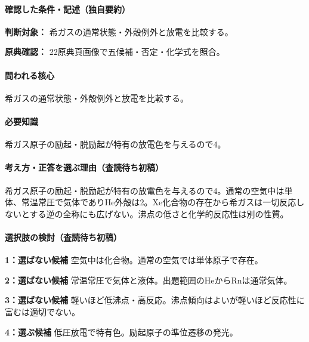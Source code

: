 \paragraph{確認した条件・記述（独自要約）}\mbox{}\par

\noindent\textbf{判断対象：} 希ガスの通常状態・外殻例外と放電を比較する。\par

\noindent\textbf{原典確認：} 22原典頁画像で五候補・否定・化学式を照合。\par

\paragraph{問われる核心} 希ガスの通常状態・外殻例外と放電を比較する。

\paragraph{必要知識} 希ガス原子の励起・脱励起が特有の放電色を与えるので4。

\paragraph{考え方・正答を選ぶ理由（査読待ち初稿）} 希ガス原子の励起・脱励起が特有の放電色を与えるので4。通常の空気中は単体、常温常圧で気体でありHe外殻は2。Xe化合物の存在から希ガスは一切反応しないとする逆の全称にも広げない。沸点の低さと化学的反応性は別の性質。

\paragraph{選択肢の検討（査読待ち初稿）}\mbox{}\par

\noindent\textbf{1：選ばない候補} 空気中は化合物。通常の空気では単体原子で存在。\par

\noindent\textbf{2：選ばない候補} 常温常圧で気体と液体。出題範囲のHeからRnは通常気体。\par

\noindent\textbf{3：選ばない候補} 軽いほど低沸点・高反応。沸点傾向はよいが軽いほど反応性に富むは適切でない。\par

\noindent\textbf{4：選ぶ候補} 低圧放電で特有色。励起原子の準位遷移の発光。\par

